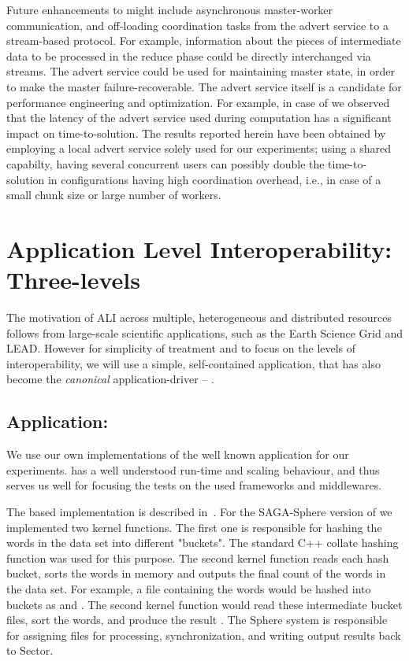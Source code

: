 \documentclass[3p,twocolumn]{elsarticle}
\begin{document}
Future enhancements to \sagamapreduce might include asynchronous
master-worker communication, and off-loading coordination tasks from
the advert service to a stream-based protocol.  For example,
information about the pieces of intermediate data to be processed in
the reduce phase could be directly interchanged via streams.  The
advert service could be used for maintaining master state, in order to
make the master failure-recoverable.  The advert service itself is a
candidate for performance engineering and optimization.  For example,
in case of \sagamapreduce we observed that the latency of the advert
service used during computation has a significant impact on
time-to-solution. The results reported herein have been obtained by
employing a local advert service solely used for our experiments;
using a shared capabilty, having several concurrent users can possibly
double the time-to-solution in configurations having high coordination
overhead, i.e., in case of a small chunk size or large number of
workers.

\section{Application Level Interoperability: Three-levels}
\label{sec:interop}

The motivation of ALI across multiple, heterogeneous and distributed
resources follows from large-scale scientific applications, such as
the Earth Science Grid and LEAD. However for simplicity of treatment
and to focus on the levels of interoperability, we will use a simple,
self-contained application, that has also become the {\it canonical}
\mr application-driver -- \wc.

\subsection{Application: \Wc}
\label{ssec:app}

We use our own implementations of the well known \wc application for
our experiments.  \Wc has a well understood run-time and scaling
behaviour, and thus serves us well for focusing the tests on the used
frameworks and middlewares.

The \mr based \wc implementation is described in~\cite{saga_ccgrid09}.
For the SAGA-Sphere version of \wc we implemented two kernel
functions. The first one is responsible for hashing the
words in the data set into different "buckets". The standard C++ 
collate hashing function was used for this purpose.  The second 
kernel function reads each hash bucket, sorts the words in memory 
and outputs the final count of the words in the data set.  For example, 
a file containing the words
 would be hashed into buckets as
 and .  The second kernel
function would read these intermediate bucket files, sort the words,
and produce the result .  The Sphere system is responsible for assigning files for
processing, synchronization, and writing output results back to
Sector.
\end{document}
